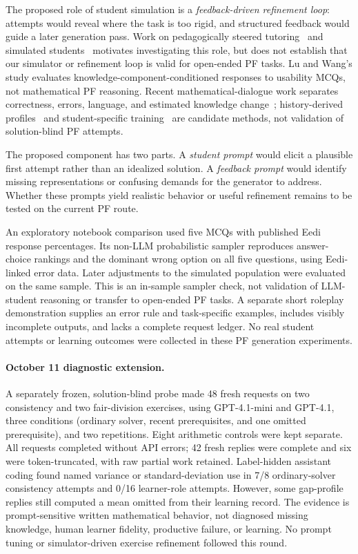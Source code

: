 The proposed role of student simulation is a \emph{feedback-driven refinement loop}: attempts would reveal where the task is too rigid, and structured feedback would guide a later generation pass. Work on pedagogically steered tutoring~\cite{puech2025} and simulated students~\cite{lu2024} motivates investigating this role, but does not establish that our simulator or refinement loop is valid for open-ended PF tasks. Lu and Wang's study evaluates knowledge-component-conditioned responses to usability MCQs, not mathematical PF reasoning. Recent mathematical-dialogue work separates correctness, errors, language, and estimated knowledge change~\cite{scarlatos2026simstudents}; history-derived profiles~\cite{duan2026history} and student-specific training~\cite{yang2026studentsim} are candidate methods, not validation of solution-blind PF attempts.

The proposed component has two parts. A \emph{student prompt} would elicit a plausible first attempt rather than an idealized solution. A \emph{feedback prompt} would identify missing representations or confusing demands for the generator to address. Whether these prompts yield realistic behavior or useful refinement remains to be tested on the current PF route.

An exploratory notebook comparison used five MCQs with published Eedi response percentages. Its non-LLM probabilistic sampler reproduces answer-choice rankings and the dominant wrong option on all five questions, using Eedi-linked error data. Later adjustments to the simulated population were evaluated on the same sample. This is an in-sample sampler check, not validation of LLM-student reasoning or transfer to open-ended PF tasks. A separate short roleplay demonstration supplies an error rule and task-specific examples, includes visibly incomplete outputs, and lacks a complete request ledger. No real student attempts or learning outcomes were collected in these PF generation experiments.

\paragraph{October 11 diagnostic extension.} A separately frozen, solution-blind probe made 48 fresh requests on two consistency and two fair-division exercises, using GPT-4.1-mini and GPT-4.1, three conditions (ordinary solver, recent prerequisites, and one omitted prerequisite), and two repetitions. Eight arithmetic controls were kept separate. All requests completed without API errors; 42 fresh replies were complete and six were token-truncated, with raw partial work retained. Label-hidden assistant coding found named variance or standard-deviation use in 7/8 ordinary-solver consistency attempts and 0/16 learner-role attempts. However, some gap-profile replies still computed a mean omitted from their learning record. The evidence is prompt-sensitive written mathematical behavior, not diagnosed missing knowledge, human learner fidelity, productive failure, or learning. No prompt tuning or simulator-driven exercise refinement followed this round.

